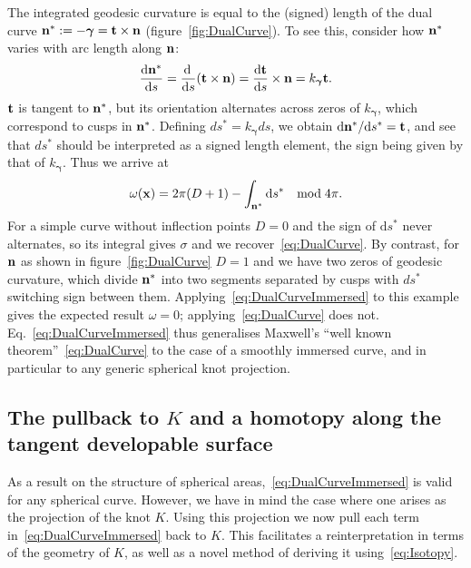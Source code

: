     The integrated geodesic curvature is equal to the (signed) length of the dual curve ${\bf n}^* := -{\boldsymbol \gamma} = {\bf t} \times {\bf n}$ \citep{Levi1994,Arnold1995}(figure~\ref{fig:DualCurve}). To see this, consider how ${\bf n}^*$ varies with arc length along ${\bf n}$:
    \begin{equation}
        \frac{\mathrm{d}{\bf n}^*}{\mathrm{d}s} = \frac{\mathrm{d}\,}{\mathrm{d}s}({\bf t} \times {\bf n}) = \frac{\mathrm{d}{\bf t}}{\mathrm{d}s} \times {\bf n}= k_{{\boldsymbol \gamma}} {\bf t} .
        \label{eq:dn*ds}
    \end{equation}
    ${\bf t}$ is tangent to ${\bf n}^*$, but its orientation alternates across zeros of $k_{\boldsymbol \gamma}$, which correspond to cusps in ${\bf n}^*$. Defining $ds^* = k_{\boldsymbol \gamma}ds$, we obtain $\mathrm{d}{\bf n}^*/\mathrm{d}s^* = {\bf t}$, and see that $ds^*$ should be interpreted as a signed length element, the sign being given by that of $k_{\boldsymbol \gamma}$. Thus we arrive at
    \begin{equation}
        \omega({\bf x}) =  2 \pi (D+1) - \int_{{\bf n}^*} \mathrm{d} s^* \quad \mathrm{mod}\; 4\pi . 
        \label{eq:DualCurveImmersed}
    \end{equation}
    For a simple curve without inflection points $D=0$ and the sign of $\mathrm{d}s^*$ never alternates, so its integral gives $\sigma$ and we recover~\eqref{eq:DualCurve}. By contrast, for $\bf {n}$ as shown in figure~\ref{fig:DualCurve} $D=1$ and we have two zeros of geodesic curvature, which divide $\bf{n}^*$ into two segments separated by cusps with $ds^*$ switching sign between them. Applying~\eqref{eq:DualCurveImmersed} to this example gives the expected result $\omega =0$; applying~\eqref{eq:DualCurve} does not. Eq.~\eqref{eq:DualCurveImmersed} thus generalises Maxwell's ``well known theorem''~\eqref{eq:DualCurve} to the case of a smoothly immersed curve, and in particular to any generic spherical knot projection. 

    \subsection{The pullback to $K$ and a homotopy along the tangent developable surface}
    \label{subsec:Pullback}

    As a result on the structure of spherical areas,~\eqref{eq:DualCurveImmersed} is valid for any spherical curve. However, we have in mind the case where one arises as the projection of the knot $K$. Using this projection we now pull each term in~\eqref{eq:DualCurveImmersed} back to $K$. This facilitates a reinterpretation in terms of the geometry of $K$, as well as a novel method of deriving it using~\eqref{eq:Isotopy}.

